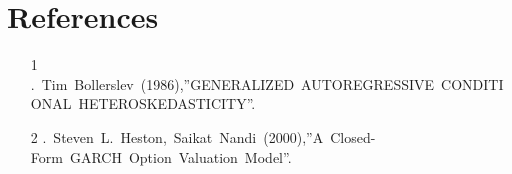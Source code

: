 \documentclass[slide,10pt]{jsarticle}
\def\sheet #1{\section*{\centering \large \bfseries #1}}
\begin{document}
\sheet{\Huge References}
{\huge

\begin{itemize}
	\vspace{10mm}
	\item [1].\ Tim\ Bollerslev\ (1986),\quad ''GENERALIZED\ AUTOREGRESSIVE\ CONDITIONAL\ HETEROSKEDASTICITY''.
	\vspace{5mm}
	\item [2].\ Steven\ L.\ Heston,\ Saikat\ Nandi\ (2000),\quad ''A\ Closed-Form\ GARCH\ Option\ Valuation\ Model''.
\end{itemize}

}
\end{document}
